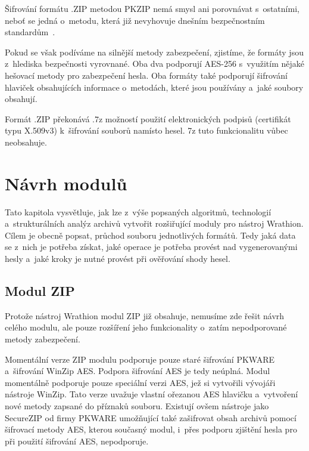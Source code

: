  Šifrování formátu .ZIP metodou PKZIP nemá smysl ani porovnávat s~ostatními, neboť se jedná
o~metodu, která již nevyhovuje dnešním bezpečnostním standardům~\cite{PKWARE:2014}. 

 Pokud se však podíváme na silnější metody zabezpečení, zjistíme, že formáty jsou z~hlediska
bezpečnosti vyrovnané. Oba dva podporují AES-256 s~využitím nějaké hešovací metody pro zabezpečení
hesla. Oba formáty také podporují šifrování hlaviček obsahujících informace o~metodách, které jsou
používány a~jaké soubory obsahují.

 Formát .ZIP překonává .7z možností použití elektronických podpisů (certifikát typu X.509v3)
k~šifrování souborů namísto hesel. 7z tuto funkcionalitu vůbec neobsahuje. 



\chapter{Návrh modulů}
\label{ch:moduly}
Tato kapitola vysvětluje, jak lze z~výše popsaných algoritmů, technologií a~strukturálních
analýz archivů vytvořit rozšiřující moduly pro nástroj Wrathion. Cílem je obecně popsat, průchod
souboru jednotlivých formátů. Tedy jaká data se z~nich je potřeba získat, jaké operace je
potřeba provést nad vygenerovanými hesly a~jaké kroky je nutné provést při ověřování shody hesel.

\section{Modul ZIP}
Protože nástroj Wrathion modul ZIP již obsahuje, nemusíme zde řešit návrh celého modulu, ale pouze
rozšíření jeho funkcionality o~zatím nepodporované metody zabezpečení.

 Momentální verze ZIP modulu podporuje pouze staré šifrování PKWARE a~šifrování WinZip AES. Podpora
šifrování AES je tedy neúplná. Modul momentálně podporuje pouze speciální verzi AES, jež si
vytvořili vývojáři nástroje WinZip. Tato verze uvažuje vlastní ořezanou AES hlavičku a~vytvoření
nové metody zapsané do příznaků souboru. Existují ovšem nástroje jako SecureZIP od firmy PKWARE umožňující také
zašifrovat obsah archivů pomocí šifrovací metody AES, kterou současný modul, i~přes podporu zjištění
hesla pro při použití šifrování AES, nepodporuje.


